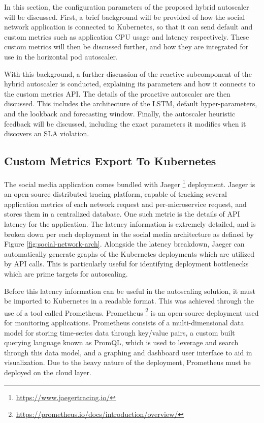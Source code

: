 
In this section, the configuration parameters of the proposed hybrid autoscaler will be discussed. First, a brief background will be provided of how the social network application is connected to Kubernetes, so that it can send default and custom metrics such as application CPU usage and latency respectively. These custom metrics will then be discussed further, and how they are integrated for use in the horizontal pod autoscaler.\par

With this background, a further discussion of the reactive subcomponent of the hybrid autoscaler is conducted, explaining its parameters and how it connects to the custom metrics API. The details of the proactive autoscaler are then discussed. This includes the architecture of the LSTM, default hyper-parameters, and the lookback and forecasting window. Finally, the autoscaler heuristic feedback will be discussed, including the exact parameters it modifies when it discovers an SLA violation.\par

\subsection{Custom Metrics Export To Kubernetes}
\label{subsec:metrics-export}

The social media application comes bundled with Jaeger \footnote{\url{https://www.jaegertracing.io/}} deployment. Jaeger is an open-source distributed tracing platform, capable of tracking several application metrics of each network request and per-microservice request, and stores them in a centralized database. One such metric is the details of API latency for the application. The latency information is extremely detailed, and is broken down per each deployment in the social media architecture as defined by Figure \ref{fig:social-network-arch}. Alongside the latency breakdown, Jaeger can automatically generate graphs of the Kubernetes deployments which are utilized by API calls. This is particularly useful for identifying deployment bottlenecks which are prime targets for autoscaling.\par

Before this latency information can be useful in the autoscaling solution, it must be imported to Kubernetes in a readable format. This was achieved through the use of a tool called Prometheus. Prometheus \footnote{\url{https://prometheus.io/docs/introduction/overview/}} is an open-source deployment used for monitoring applications. Prometheus consists of a multi-dimensional data model for storing time-series data through key/value pairs, a custom built querying language known as PromQL, which is used to leverage and search through this data model, and a graphing and dashboard user interface to aid in visualization. Due to the heavy nature of the deployment, Prometheus must be deployed on the cloud layer.\par

